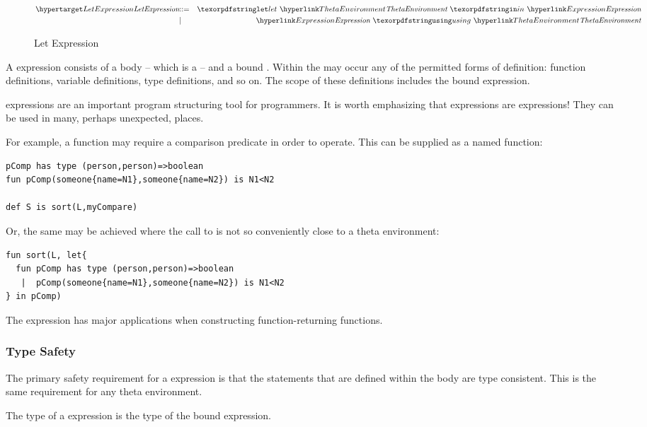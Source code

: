 \begin{figure}[htbp]
\begin{eqnarray*}
\ntDef{LetExpression}&\arrow&\q{let}\ \ntRef{ThetaEnvironment}\ \q{in}\ \ntRef{Expression}\\
&\choice&\ntRef{Expression}\ \q{using}\ \ntRef{ThetaEnvironment}
\end{eqnarray*}
\caption{Let Expression}
\label{letExpressionFig}
\end{figure}

A  expression consists of a body -- which is a  -- and a bound . Within the  may occur any of the permitted forms of definition: function definitions, variable definitions, type definitions, and so on. The scope of these definitions includes the bound expression.

\begin{aside}
 expressions are an important program structuring tool for programmers. It is worth emphasizing that  expressions are expressions! They can be used in many, perhaps unexpected, places.

For example, a  function may require a comparison predicate in order to operate. This can be supplied as a named function:
\begin{lstlisting}
pComp has type (person,person)=>boolean
fun pComp(someone{name=N1},someone{name=N2}) is N1<N2

def S is sort(L,myCompare)
\end{lstlisting}
Or, the same may be achieved where the call to  is not so conveniently close to a theta environment:
\begin{lstlisting}
fun sort(L, let{
  fun pComp has type (person,person)=>boolean
   |  pComp(someone{name=N1},someone{name=N2}) is N1<N2
} in pComp)
\end{lstlisting}
The  expression has major applications when constructing function-returning functions.
\end{aside}

\subsubsection{Type Safety}
The primary safety requirement for a  expression is that the statements that are defined within the body are type consistent. This is the same requirement for any theta environment.

The type of a  expression is the type of the bound expression.


